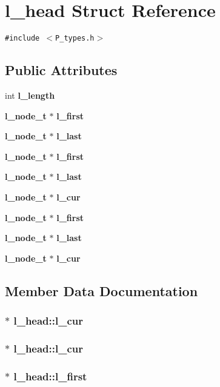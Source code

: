 \section{l\_\-head  Struct Reference}
\label{structl__head}
{\tt \#include $<$P\_\-types.h$>$}

\subsection*{Public Attributes}
\begin{CompactItemize}
\item 
int {\bf l\_\-length}
\item 
{\bf l\_\-node\_\-t} $\ast$ {\bf l\_\-first}
\item 
{\bf l\_\-node\_\-t} $\ast$ {\bf l\_\-last}
\item 
{\bf l\_\-node\_\-t} $\ast$ {\bf l\_\-first}
\item 
{\bf l\_\-node\_\-t} $\ast$ {\bf l\_\-last}
\item 
{\bf l\_\-node\_\-t} $\ast$ {\bf l\_\-cur}
\item 
{\bf l\_\-node\_\-t} $\ast$ {\bf l\_\-first}
\item 
{\bf l\_\-node\_\-t} $\ast$ {\bf l\_\-last}
\item 
{\bf l\_\-node\_\-t} $\ast$ {\bf l\_\-cur}
\end{CompactItemize}


\subsection{Member Data Documentation}
\subsubsection{$\ast$ l\_\-head::l\_\-cur}\label{structl__head_m8}


\subsubsection{$\ast$ l\_\-head::l\_\-cur}\label{structl__head_m5}


\subsubsection{$\ast$ l\_\-head::l\_\-first}\label{structl__head_m6}


